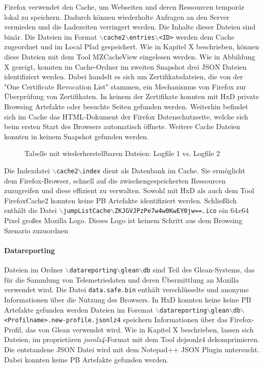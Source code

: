 Firefox verwendet den Cache, um Webseiten und deren Ressourcen temporär lokal zu speichern. Dadurch können wiederholte Anfragen an den Server vermieden und die Ladezeiten verringert werden. Die Inhalte dieser Dateien sind binär.
Die Dateien im Format \texttt{$\backslash$cache2$\backslash$entries$\backslash$<ID>} werden dem Cache zugeordnet und im Local Pfad gespeichert.
Wie in Kapitel X beschrieben, können diese Dateien mit dem Tool MZCacheView eingelesen werden.
Wie in Abbildung X gezeigt, konnten im Cache-Ordner im zweiten Snapshot drei JSON Dateien identifiziert werden. Dabei handelt es sich um Zertifikatsdateien, die von der "One Certificate Revocation List" stammen, ein Mechanismus von Firefox zur Überprüfung von Zertifikaten. In keinem der Zertifikate konnten mit HxD private Browsing Artefakte oder besuchte Seiten gefunden werden.
Weiterhin befindet sich im Cache das HTML-Dokument der Firefox Datenschutzseite, welche sich beim ersten Start des Browsers automatisch öffnete. %
Weitere Cache Dateien konnten in keinem Snapshot gefunden werden.
\begin{figure}[h!]
	\caption{Tabelle mit wiederherstellbaren Dateien: Logfile 1 vs. Logfile 2}
\end{figure}
Die Indexdatei \texttt{$\backslash$cache2$\backslash$index} dient als Datenbank im Cache. Sie ermöglicht dem Firefox-Browser, schnell auf die zwischengespeicherten Ressourcen zuzugreifen und diese effizient zu verwalten. Sowohl mit HxD als auch dem Tool FirefoxCache2 konnten keine PB Artefakte identifiziert werden.
Schließlich enthält die Datei \texttt{$\backslash$jumpListCache$\backslash$ZKJGVJPzPe7w4w0KwEY0jw==.ico} ein $64x64$ Pixel großes Mozilla Logo. Dieses Logo ist keinem Schritt aus dem Browsing Szenario zuzuordnen


\paragraph*{Datareporting}
Dateien im Ordner \texttt{$\backslash$datareporting$\backslash$glean$\backslash$db} sind Teil des Glean-Systems, das für die Sammlung von Telemetriedaten und deren Übermittlung an Mozilla verwendet wird. 
Die Datei \texttt{data.safe.bin} enthält verschlüsselte und anonyme Informationen über die Nutzung des Browsers. In HxD konnten keine keine PB Artefakte gefunden werden
Dateien im Foremat \texttt{$\backslash$datareporting$\backslash$glean$\backslash$db$\backslash$<Profilname>.new-profile.jsonlz4} speichern Informationen über das Firefox-Profil, das von Glean verwendet wird. Wie in Kapitel X beschrieben, lassen sich Dateien, im proprietären \textit{jsonlz4}-Format mit dem Tool dejsonlz4 dekomprimieren. Die entstandene JSON Datei wird mit dem Notepad++ JSON Plugin untersucht. Dabei konnten keine PB Artefakte gefunden werden.

